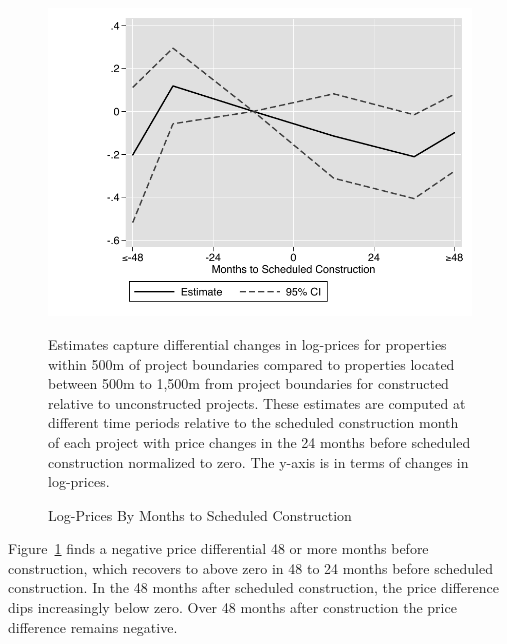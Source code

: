 \documentclass[12pt]{article}
\begin{document}
\begin{figure}[!htb]
      {  \centering
   \caption[ Log-Prices By Months to Scheduled Construction ]
    {\small Log-Prices By Months to Scheduled Construction }\label{figure:pricesovertime} 
\includegraphics[width=\textwidth,trim={0.3cm .3cm 0.1cm 0cm}, clip=true]{figures/price_time_3d_ctrl_q_one.pdf}
}
Estimates capture differential changes in log-prices for properties within 500m of project boundaries compared to properties located between 500m to 1,500m from project boundaries for constructed relative to unconstructed projects.  These estimates are computed at different time periods relative to the scheduled construction month of each project with price changes in the 24 months before scheduled construction normalized to zero.   The y-axis is in terms of changes in log-prices.
\end{figure}

Figure~\ref{figure:pricesovertime}  finds a negative price differential 48 or more months before construction, which recovers to above zero in 48 to 24 months before scheduled construction.  In the 48 months after scheduled construction, the price difference dips increasingly below zero.  Over 48 months after construction the price difference remains negative.
\end{document}
